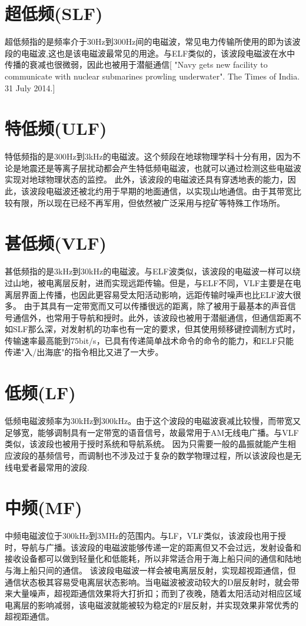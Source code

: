 \documentclass[UTF8]{article}
\begin{document}
\begin{CJK}{UTF8}{gkai}
\section*{超低频(SLF)}
超低频指的是频率介于30Hz到300Hz间的电磁波，常见电力传输所使用的即为该波段的电磁波,这也是该电磁波最常见的用途。与ELF类似的，该波段电磁波在水中传播的衰减也很微弱，因此也被用于潜艇通信[ "Navy gets new facility to communicate with nuclear submarines prowling underwater". The Times of India. 31 July 2014.]
\section{特低频(ULF)}
特低频指的是300Hz到3kHz的电磁波。这个频段在地球物理学科十分有用，因为不论是地震还是等离子层扰动都会产生特低频电磁波，也就可以通过检测这些电磁波实现对地球物理状态的监控。
此外，该波段的电磁波还具有穿透地表的能力，因此，该波段电磁波还被北约用于早期的地面通信，以实现山地通信。由于其带宽比较有限，所以现在已经不再军用，但依然被广泛采用与挖矿等特殊工作场所。
\section{甚低频(VLF)}
甚低频指的是3kHz到30kHz的电磁波。与ELF波类似，该波段的电磁波一样可以绕过山地，被电离层反射，进而实现远距传输。但是，与ELF不同，VLF主要是在电离层界面上传播，也因此更容易受太阳活动影响，远距传输时噪声也比ELF波大很多。
由于其具有一定带宽而又可以传播很远的距离，除了被用于最基本的声音信号通信外，也常用于导航和授时。此外，该波段也被用于潜艇通信，但通信距离不如SLF那么深，对发射机的功率也有一定的要求，但其使用频移键控调制方式时，传输速率最高能到75bit/s，已具有传递简单战术命令的命令的能力，和ELF只能传递"入/出海底"的指令相比又进了一大步。
\section{低频(LF)}
低频电磁波频率为30kHz到300kHz。由于这个波段的电磁波衰减比较慢，而带宽又足够宽，能够调制具有一定带宽的语音信号，故最常用于AM无线电广播。与VLF类似，该波段也被用于授时系统和导航系统。
因为只需要一般的晶振就能产生相应波段的基频信号，而调制也不涉及过于复杂的数学物理过程，所以该波段也是无线电爱者最常用的波段.
\section{中频(MF)}
中频电磁波位于300kHz到3MHz的范围内。与LF，VLF类似，该波段也用于授时，导航与广播。该波段的电磁波能够传递一定的距离但又不会过远，发射设备和接收设备都可以做到轻量化和低能耗，所以非常适合用于海上船只间的通信和陆地与海上船只间的通信。
该波段电磁波一样会被电离层反射，实现超视距通信，但通信状态极其容易受电离层状态影响。当电磁波被波动较大的D层反射时，就会带来大量噪声，超视距通信效果将大打折扣；而到了夜晚，随着太阳活动对相应区域电离层的影响减弱，该电磁波就能被较为稳定的F层反射，并实现效果非常优秀的超视距通信。

\end{CJK}
\end{document}
